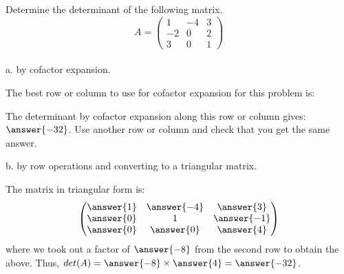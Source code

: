 \documentclass{ximera}
\author{Parisa Fatheddin}
\begin{document}
\begin{exercise}


Determine the determinant of the following matrix.
\[
A= \begin{pmatrix}
1 & -4 & 3\\
-2 & 0 & 2\\
3 & 0 & 1
\end{pmatrix}
\]\\

a. by cofactor expansion. \\

\begin{prompt}
The best row or column to use for cofactor expansion for this problem is:
\begin{multipleChoice}
\end{multipleChoice}

The determinant by cofactor expansion along this row or column gives: $\answer{-32}$. Use another row or column and check that you get the same answer.
\end{prompt}


b. by row operations and converting to a triangular matrix.

\begin{prompt}
The matrix in triangular form is:
\[\begin{pmatrix}
\answer{1} & \answer{-4} & \answer{3}\\
\answer{0} & 1 & \answer{-1}\\
\answer{0} & \answer{0} & \answer{4}
\end{pmatrix}\]
where we took out a factor of $\answer{-8}$ from the second row to obtain the above. Thus, $det(A) = \answer{-8} \times \answer{4} =  \answer{-32}$.
\end{prompt}




















\end{exercise}
\end{document}
